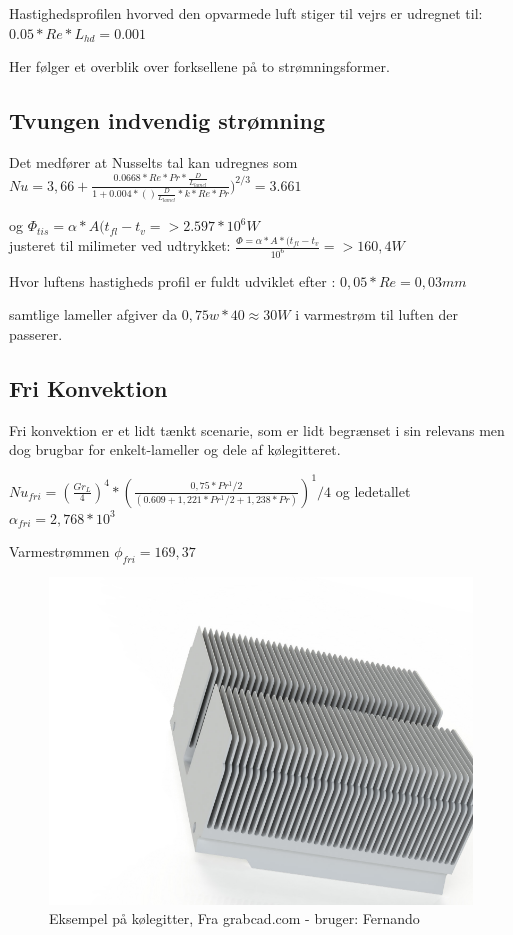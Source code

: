 Hastighedsprofilen hvorved den opvarmede luft stiger til vejrs er udregnet til: 
$0.05*Re*L_{hd} = 0.001 $

Her følger et overblik over forksellene på to strømningsformer.

\subsection{Tvungen indvendig strømning}
Det medfører at Nusselts tal kan udregnes som \\ 
$Nu = 3,66+ \frac{0.0668*Re*Pr*\frac{D}{L_{lamel}}}{1+0.004*()\frac{D}{L_{lamel}}*k *Re*Pr})^{2/3} = 3.661$



og $ \Phi_{tis} = \alpha*A(t_{fl}-t_v =>2.597*10^6 W $\\ 
justeret til milimeter ved udtrykket: $\frac{\Phi = \alpha*A*(t_{fl}-t_v}{10^6} =>160,4 W$

Hvor luftens hastigheds profil er fuldt udviklet efter :
$0,05*Re = 0,03 mm$

samtlige lameller afgiver da $0,75 w* 40 \approx 30 W$ i varmestrøm til luften der passerer. 

\subsection{Fri Konvektion}

Fri konvektion er et lidt tænkt scenarie, som er lidt begrænset i sin relevans men dog brugbar for enkelt-lameller og dele af kølegitteret.

$Nu_{fri} = (\frac{Gr_{L}}{4})^4 * (\frac{0,75*Pr^1/2}{(0.609+1,221*Pr^1/2+1,238*Pr)})^1/4$
og ledetallet $\alpha_{fri} = 2,768*10^3$

Varmestrømmen $\phi_{fri}=169,37$

\begin{figure}
	\centering
	\includegraphics[width=0.7\linewidth]{billeder/heatsink1}
	\caption{Eksempel på kølegitter, Fra grabcad.com - bruger: Fernando}
	\label{fig:heatsink1}
\end{figure}

